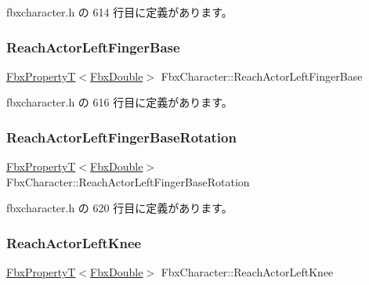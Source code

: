  fbxcharacter.\+h の 614 行目に定義があります。

\mbox{\label{class_fbx_character_a7e5392f3362125d4af59a89641f7dd5f}} 
\subsubsection{\texorpdfstring{Reach\+Actor\+Left\+Finger\+Base}{ReachActorLeftFingerBase}}
{\footnotesize\ttfamily \hyperlink{class_fbx_property_t}{Fbx\+PropertyT}$<$\hyperlink{fbxtypes_8h_a171e72a1c46fc15c1a6c9c31948c1c5b}{Fbx\+Double}$>$ Fbx\+Character\+::\+Reach\+Actor\+Left\+Finger\+Base}



 fbxcharacter.\+h の 616 行目に定義があります。

\mbox{\label{class_fbx_character_aab599341793dd4ed981f7150382d81f3}} 
\subsubsection{\texorpdfstring{Reach\+Actor\+Left\+Finger\+Base\+Rotation}{ReachActorLeftFingerBaseRotation}}
{\footnotesize\ttfamily \hyperlink{class_fbx_property_t}{Fbx\+PropertyT}$<$\hyperlink{fbxtypes_8h_a171e72a1c46fc15c1a6c9c31948c1c5b}{Fbx\+Double}$>$ Fbx\+Character\+::\+Reach\+Actor\+Left\+Finger\+Base\+Rotation}



 fbxcharacter.\+h の 620 行目に定義があります。

\mbox{\label{class_fbx_character_a85b9f4a0d55767c0af58118459e97129}} 
\subsubsection{\texorpdfstring{Reach\+Actor\+Left\+Knee}{ReachActorLeftKnee}}
{\footnotesize\ttfamily \hyperlink{class_fbx_property_t}{Fbx\+PropertyT}$<$\hyperlink{fbxtypes_8h_a171e72a1c46fc15c1a6c9c31948c1c5b}{Fbx\+Double}$>$ Fbx\+Character\+::\+Reach\+Actor\+Left\+Knee}



